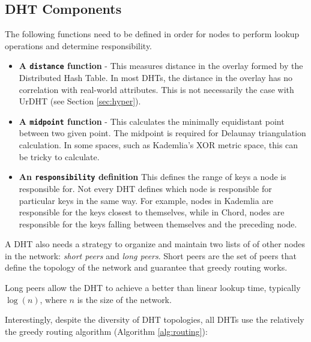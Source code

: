 \documentclass[11pt,conference]{IEEEtran}
\begin{document}
\subsection{DHT Components}
The following functions need to be defined in order for nodes to perform lookup operations and determine responsibility.
\begin{itemize}
	\item \textbf{A \texttt{distance} function } - 
	This measures distance in the overlay formed by the Distributed Hash Table.
	In most DHTs, the distance in the overlay has no correlation with real-world attributes.
	This is not necessarily the case with UrDHT (see Section \ref{sec:hyper}).
	
	\item \textbf{A \texttt{midpoint} function} - This calculates the minimally equidistant point between two given point.
	The midpoint is required for Delaunay triangulation calculation.
	In some spaces, such as Kademlia's XOR metric space, this can be tricky to calculate.  %
	\item \textbf{An \texttt{responsibility} definition}  This defines the range of keys a node is responsible for. 
	Not every DHT defines which node is responsible for particular keys in the same way. 
	For example, nodes in Kademlia are responsible for the keys closest to themselves, while in Chord, nodes are responsible for the keys falling between themselves and the preceding node.
\end{itemize}


A DHT also needs a strategy to organize and maintain two lists of of other nodes in the network: \textit{short peers} and \textit{long peers}.
Short peers are the set of peers that define the topology of the network and guarantee that greedy routing works.

Long peers allow the DHT to achieve a better than linear lookup time, typically $ \log(n) $, where $n$ is the size of the network. 

Interestingly, despite the diversity of DHT topologies, all DHTs use the relatively the greedy routing algorithm (Algorithm \ref{alg:routing}):
\end{document}
